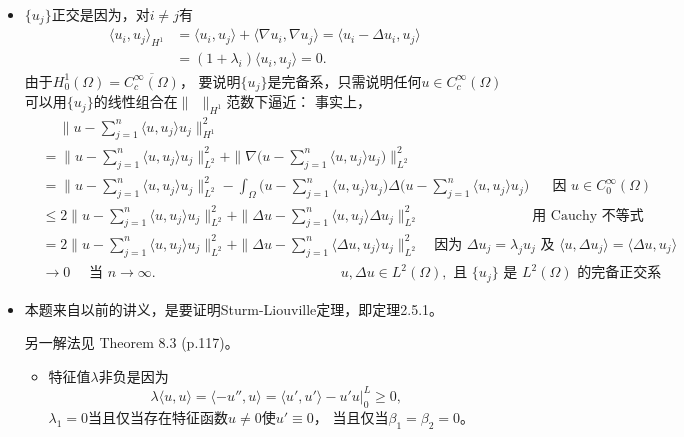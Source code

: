 \begin{itemize}
    \item[3.]
    $\{u_j\}$正交是因为，对$i\neq j$有
    \begin{align*}
        \langle u_i,u_j\rangle_{H^1}
        &=\langle u_i,u_j\rangle+\langle\nabla u_i,\nabla u_j\rangle
        =\langle u_i-\Delta u_i,u_j\rangle\\
        &=(1+\lambda_i)\langle u_i,u_j\rangle=0.
    \end{align*}
    由于$H_0^1(\varOmega)=\overline{C_c^\infty(\varOmega)}$，
    要说明$\{u_j\}$是完备系，只需说明任何$u\in C_c^\infty(\varOmega)$
    可以用$\{u_j\}$的线性组合在$\|\ \ \|_{H^1}$范数下逼近： 
    事实上，
    \begin{align*}
        &\quad\ \|u-\sum_{j=1}^n\langle u,u_j\rangle u_j\|^2_{H^1}\\
        &=\|u-\sum_{j=1}^n\langle u,u_j\rangle u_j\|^2_{L^2}
        +\|\nabla\big(u-\sum_{j=1}^n\langle u,u_j\rangle u_j\big)\|^2_{L^2}\\
        &=\|u-\sum_{j=1}^n\langle u,u_j\rangle u_j\|^2_{L^2}
        -\int_\varOmega\big(u-\sum_{j=1}^n\langle u,u_j\rangle u_j\big)\Delta\big(u-\sum_{j=1}^n\langle u,u_j\rangle u_j\big)\quad\ \ \ \text{因 }u\in C^\infty_0(\varOmega)\\
        &\leqslant2\|u-\sum_{j=1}^n\langle u,u_j\rangle u_j\|^2_{L^2}
        +\|\Delta u-\sum_{j=1}^n\langle u,u_j\rangle \Delta u_j\|^2_{L^2}\qquad\qquad\qquad\qquad\text{用 Cauchy 不等式}\\
        &=2\|u-\sum_{j=1}^n\langle u,u_j\rangle u_j\|^2_{L^2}
        +\|\Delta u-\sum_{j=1}^n\langle \Delta u,u_j\rangle u_j\|^2_{L^2}\quad\text{因为 }\Delta u_j=\lambda_ju_j\text{ 及 }\langle u,\Delta u_j\rangle=\langle \Delta u,u_j\rangle\\
        &\rightarrow0\quad\text{ 当 }n\rightarrow\infty.\qquad\quad\qquad\qquad\qquad\qquad\qquad\  u,\Delta u\in L^2(\varOmega),\text{ 且 }\{u_j\}\text{ 是 }L^2(\varOmega)\text{ 的完备正交系}
    \end{align*}

\item[0.]
本题来自以前的讲义，是要证明Sturm-Liouville定理，即定理2.5.1。

另一解法见\cite{Sa} Theorem 8.3 (p.117)。
\begin{itemize}
    \item[1.] 特征值$\lambda$非负是因为
    $$\lambda\langle u,u\rangle=\langle-u'',u\rangle
    =\langle u',u'\rangle-u'u|_0^L\geqslant0,$$
    $\lambda_1=0$当且仅当存在特征函数$u\ne0$使$u'\equiv0$，
    当且仅当$\beta_1=\beta_2=0$。


\end{itemize}
\end{itemize}
